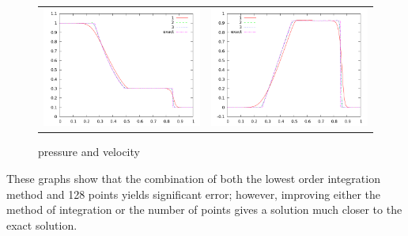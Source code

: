 \documentclass[10pt,preprint]{aastex}
\begin{document}
\begin{figure}
  \begin{center}
	\begin{tabular}{cc}
      \includegraphics[width=.425\textwidth]{prs128comp_20} &
	  \includegraphics[width=.425\textwidth]{vel128comp_20}
	\end{tabular}
  \end{center}
  \caption{pressure and velocity}
\end{figure}


These graphs show that the combination of both the lowest order integration method and 128 points yields significant error; however, improving either the method of integration or the number of points gives a solution much closer to the exact solution. 

\clearpage
\end{document}
